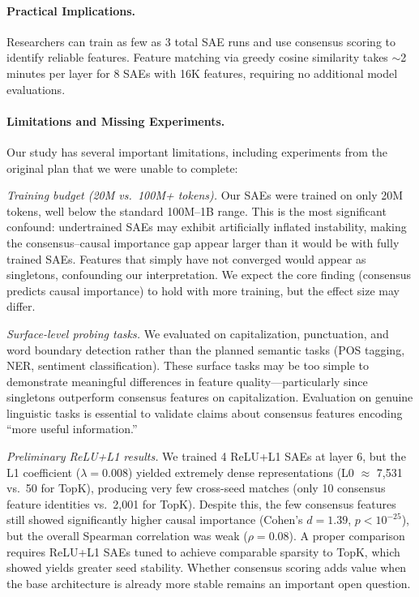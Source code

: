 \documentclass{article}
\begin{document}
\paragraph{Practical Implications.}
Researchers can train as few as 3 total SAE runs and use consensus scoring to identify reliable features. Feature matching via greedy cosine similarity takes $\sim$2 minutes per layer for 8 SAEs with 16K features, requiring no additional model evaluations.

\paragraph{Limitations and Missing Experiments.}
Our study has several important limitations, including experiments from the original plan that we were unable to complete:

\emph{Training budget (20M vs.\ 100M+ tokens).} Our SAEs were trained on only 20M tokens, well below the standard 100M--1B range. This is the most significant confound: undertrained SAEs may exhibit artificially inflated instability, making the consensus--causal importance gap appear larger than it would be with fully trained SAEs. Features that simply have not converged would appear as singletons, confounding our interpretation. We expect the core finding (consensus predicts causal importance) to hold with more training, but the effect size may differ.

\emph{Surface-level probing tasks.} We evaluated on capitalization, punctuation, and word boundary detection rather than the planned semantic tasks (POS tagging, NER, sentiment classification). These surface tasks may be too simple to demonstrate meaningful differences in feature quality---particularly since singletons outperform consensus features on capitalization. Evaluation on genuine linguistic tasks is essential to validate claims about consensus features encoding ``more useful information.''

\emph{Preliminary ReLU+L1 results.} We trained 4 ReLU+L1 SAEs at layer 6, but the L1 coefficient ($\lambda = 0.008$) yielded extremely dense representations (L0 $\approx$ 7{,}531 vs.\ 50 for TopK), producing very few cross-seed matches (only 10 consensus feature identities vs.\ 2{,}001 for TopK). Despite this, the few consensus features still showed significantly higher causal importance (Cohen's $d = 1.39$, $p < 10^{-25}$), but the overall Spearman correlation was weak ($\rho = 0.08$). A proper comparison requires ReLU+L1 SAEs tuned to achieve comparable sparsity to TopK, which \citet{paulo2025sparse} showed yields greater seed stability. Whether consensus scoring adds value when the base architecture is already more stable remains an important open question.
\end{document}
